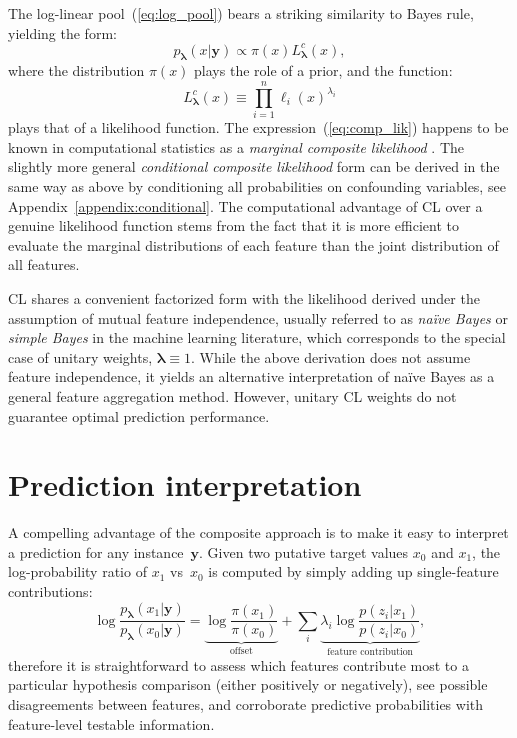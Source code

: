 \documentclass[english]{scrartcl}
\def\y{{\mathbf{y}}}
\newcommand{\blambda}{{\boldsymbol{\lambda}}}
\begin{document}
The log-linear pool~(\ref{eq:log_pool}) bears a striking similarity to Bayes rule, yielding  the form: 
$$
p_\blambda(x|\y)\propto \pi(x) L^c_\blambda(x),
$$
where the distribution $\pi(x)$ plays the role of a prior, and the function:
\begin{equation}
\label{eq:comp_lik}
L^c_\blambda(x) \equiv \prod_{i=1}^n \ell_i (x)^{\lambda_i}
\end{equation} 
plays that of a likelihood function. The expression~(\ref{eq:comp_lik}) happens to be known in computational statistics as a {\em marginal composite likelihood} \cite{Varin-11}. The slightly more general {\em conditional composite likelihood} form can be derived in the same way as above by conditioning all probabilities on confounding variables, see Appendix~\ref{appendix:conditional}. The computational advantage of CL over a genuine likelihood function stems from the fact that it is more efficient to evaluate the marginal distributions of each feature than the joint distribution of all features.

CL shares a convenient factorized form with the likelihood derived under the assumption of mutual feature independence, usually referred to as {\em na\"ive Bayes} or {\em simple Bayes} in the machine learning literature, which corresponds to the special case of unitary weights, $\blambda\equiv 1$. While the above derivation does not assume feature independence, it yields an alternative interpretation of na\"ive Bayes as a general feature aggregation method. However, unitary CL weights do not guarantee optimal prediction performance.


\section{Prediction interpretation}

A compelling advantage of the composite approach is to make it easy to interpret a prediction for any instance~$\y$. Given two putative target values $x_0$ and $x_1$, the log-probability ratio of $x_1$ vs~$x_0$ is computed by simply adding up single-feature contributions: 
$$
\log \frac{p_\blambda(x_1|\y)}{p_\blambda(x_0|\y)}
= 
\underbrace{\log \frac{\pi(x_1)}{\pi(x_0)}}_{\text{offset}}
+ \sum_i \underbrace{\lambda_i \log \frac{p(z_i|x_1)}{p(z_i|x_0)}}_{\text{feature contribution}},
$$
therefore it is straightforward to assess which features contribute most to a particular hypothesis comparison (either positively or negatively), see possible disagreements between features, and corroborate predictive probabilities with feature-level testable information. 
\end{document}
